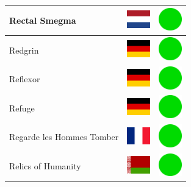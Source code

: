 \documentclass[12pt, a4paper, twoside]{report}
\begin{document}
\begin{center}
\begin{longtable}{|p{5cm}|p{2cm}|p{2cm}|}
 Rectal Smegma                                              & \includegraphics[width=1cm]{../img/flags/nl} &   \includegraphics[width=1cm]{../likes/y} \\ \hline
 Redgrin                                                    & \includegraphics[width=1cm]{../img/flags/de} &   \includegraphics[width=1cm]{../likes/y} \\ \hline
 Reflexor                                                   & \includegraphics[width=1cm]{../img/flags/de} &   \includegraphics[width=1cm]{../likes/y} \\ \hline
 Refuge                                                     & \includegraphics[width=1cm]{../img/flags/de} &   \includegraphics[width=1cm]{../likes/y} \\ \hline
 Regarde les Hommes Tomber                                  & \includegraphics[width=1cm]{../img/flags/fr} &   \includegraphics[width=1cm]{../likes/y} \\ \hline
 Relics of Humanity                                         & \includegraphics[width=1cm]{../img/flags/by} &   \includegraphics[width=1cm]{../likes/y} \\ \hline

\end{longtable}
\end{center}
\end{document}
